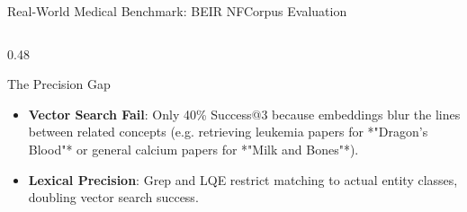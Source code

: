 \documentclass[aspectratio=169]{beamer}
\begin{document}
\begin{frame}{Real-World Medical Benchmark: BEIR NFCorpus Evaluation}
    \begin{columns}[T]
        \begin{column}{0.48\textwidth}
            \begin{block}{The Precision Gap}
                \small
                \begin{itemize}
                    \item \textbf{Vector Search Fail}: Only 40\% Success@3 because embeddings blur the lines between related concepts (e.g. retrieving leukemia papers for *"Dragon's Blood"* or general calcium papers for *"Milk and Bones"*).
                    \item \textbf{Lexical Precision}: Grep and LQE restrict matching to actual entity classes, doubling vector search success.
                \end{itemize}
            \end{block}
        \end{column}
    \end{columns}
\end{frame}
\end{document}
